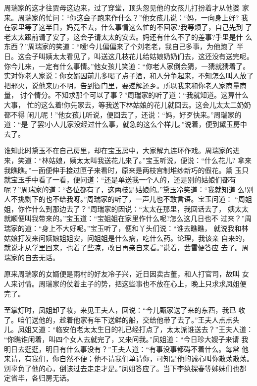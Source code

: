 周瑞家的这才往贾母这边来，过了穿堂，顶头忽见他的女孩儿打扮着才从他婆
家来。周瑞家的忙问：“你这会子跑来作什么？”他女孩儿说：“妈，一向身上好?
我在家里等了这半日，妈竟不去，什么事情这么忙的不回家?我等烦了，自己先到
了老太太跟前请了安了，这会子请太太的安去。妈还有什么不了的差事?手里是什
么东西？”周瑞家的笑道：“嗳!今儿偏偏来了个刘老老，我自己多事，为他跑了
半日。这会子叫姨太太看见了，叫送这几枝花儿给姑娘奶奶们去，这还没有送完呢。
你今儿来，一定有什么事情。”他女孩儿笑道：“你老人家倒会猜，一猜就猜着了。
实对你老人家说：你女婿因前儿多喝了点子酒，和人分争起来，不知怎么叫人放了
把邪火，说他来历不明，告到衙门里，要递解还乡。所以我来和你老人家商量商量，
讨个情分。不知求那个可以了事？”周瑞家的听了道：“我就知道。这算什么大事，
忙的这么着!你先家去，等我送下林姑娘的花儿就回去。这会儿太太二奶奶都不得
闲儿呢！”他女孩儿听说，便回去了，还说：“妈，好歹快来。”周瑞家的道：“是
了罢!小人儿家没经过什么事，就急的这么个样儿。”说着，便到黛玉房中去了。

谁知此时黛玉不在自己房里，却在宝玉房中，大家解九连环作戏。周瑞家的进
来，笑道：“林姑娘，姨太太叫我送花儿来了。”宝玉听说，便说：“什么花儿?
拿来我瞧瞧。”一面便伸手接过匣子来看时，原来是两枝宫制堆纱新巧的假花。黛
玉只就宝玉手中看了一看，便问道：“还是单送我一个人的，还是别的姑娘们都有
呢？”周瑞家的道：“各位都有了，这两枝是姑娘的。”黛玉冷笑道：“我就知道
么!别人不挑剩下的也不给我呀。”周瑞家的听了，一声儿也不敢言语。宝玉问道：
“周姐姐，你作什么到那边去了？”周瑞家的因说：“太太在那里，我回话去了，
姨太太就顺便叫我带来的。”宝玉道：“宝姐姐在家里作什么呢?怎么这几日也不
过来？”周瑞家的道：“身上不大好呢。”宝玉听了，便和丫头们说：“谁去瞧瞧，
就说我和林姑娘打发来问姨娘姐姐安，问姐姐是什么病，吃什么药。论理，我该亲
自来的，就说才从学里回来，也着了些凉，改日再亲自来看。”说着，茜雪便答应
去了。周瑞家的自去无话。

原来周瑞家的女婿便是雨村的好友冷子兴，近日因卖古董，和人打官司，故叫
女人来讨情。周瑞家的仗着主子的势，把这些事也不放在心上，晚上只求求凤姐便
完了。

至掌灯时，凤姐卸了妆，来见王夫人，回说：“今儿甄家送了来的东西，我已
收了。咱们送他的，趁着他家有年下送鲜的船，交给他带了去了。”王夫人点点头
儿。凤姐又道：“临安伯老太太生日的礼已经打点了，太太派谁送去？”王夫人道：
“你瞧谁闲着，叫四个女人去就完了，又来问我。”凤姐道：“今日珍大嫂子来请
我明日去逛逛，明日有什么事没有？”王夫人道：“有事没事都碍不着什么。每常
他来请，有我们，你自然不便；他不请我们单请你，可知是他的诚心叫你散荡散荡。
别辜负了他的心，倒该过去走走才是。”凤姐答应了。当下李纨探春等姊妹们也都
定省毕，各归房无话。

